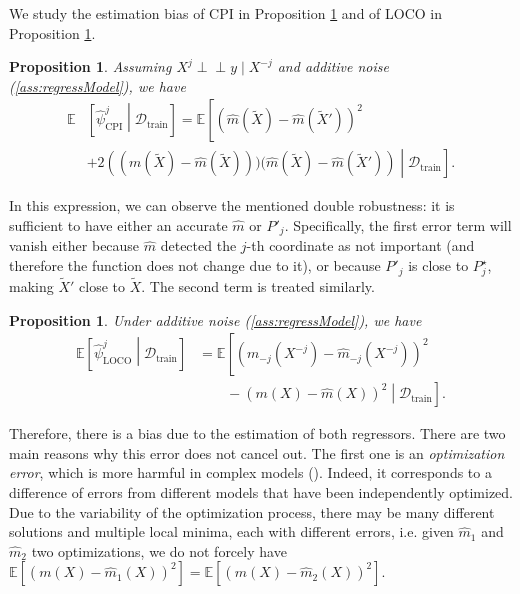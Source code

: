 \documentclass{article}
\theoremstyle{plain}
\newtheorem{proposition}[theorem]{Proposition}
\theoremstyle{definition}
\theoremstyle{remark}
\newcommand{\e}[1]{\mathbb{E}\left[#1\right]  } %
\newcommand{\indep}{\perp\!\!\!\perp}
\begin{document}
We study the estimation bias of CPI in Proposition \ref{prop:cpi-bias} and of LOCO in Proposition \ref{prop:loco-bias}.

 
 \begin{proposition}
Assuming $X^j \indep y \mid X^{-j}$ and additive noise (\ref{ass:regressModel}), we have 
\begin{align*}
     \mathbb{E}&\left[\widehat{\psi}_\mathrm{CPI}^j\middle|\mathcal{D}_\mathrm{train}\right]=\mathbb{E}\left[\left(\widehat{m}(\widetilde{X})-\widehat{m}(\widetilde{X}')\right)^2\right.\\&\left.+2\left((m(\widetilde{X})-\widehat{m}(\widetilde{X})))(\widehat{m}(\widetilde{X})-\widehat{m}(\widetilde{X}')\right)\middle|\mathcal{D}_\mathrm{train}\right].
 \end{align*}
 \label{prop:cpi-bias}
\end{proposition}
%
In this expression, we can observe the mentioned double robustness: it is sufficient to have either an accurate \( \widehat{m} \) or \( P'_j \). Specifically, the first error term will vanish either because \( \widehat{m} \) detected the \( j \)-th coordinate as not important (and therefore the function does not change due to it), or because \( P'_j \) is close to \( P^\star_j \), making \( \widetilde{X}' \) close to \( \widetilde{X} \). The second term is treated similarly.

%
 \begin{proposition}
 Under additive noise (\ref{ass:regressModel}), we have
 \begin{align*}
     \mathbb{E}\left[\widehat{\psi}_\mathrm{LOCO}^j\middle|\mathcal{D}_\mathrm{train}\right]&= \mathbb{E}\left[\left(m_{-j}(X^{-j})-\widehat{m}_{-j}(X^{-j})\right)^2\right.\\&\left.\qquad-(m(X)-\widehat{m}(X))^2\middle|\mathcal{D}_\mathrm{train}\right]. 
 \end{align*}
 \label{prop:loco-bias}
 \end{proposition}
% 
Therefore, there is a bias due to the estimation of both regressors. There are two main reasons why this error does not cancel out. The first one is an \emph{optimization error}, which is more harmful in complex models (\citet{opt_error}). Indeed, it corresponds to a difference of errors from different models that have been independently optimized. Due to the variability of the optimization process, there may be many different solutions and multiple local minima, each with different errors, i.e. given $\widehat{m}_1$ and $\widehat{m}_2$ two optimizations, we do not forcely have $\e{(m(X)-\widehat{m}_1(X))^2}=\e{(m(X)-\widehat{m}_2(X))^2}$.  
\end{document}
